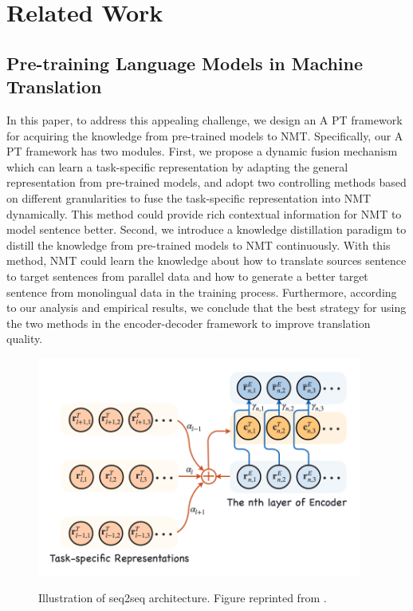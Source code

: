 \chapter{Related Work}

\section{Pre-training Language Models in Machine Translation}

\cite{weng2020acquiring} In this paper, to address this appealing challenge, we design an A PT framework for acquiring the knowledge from pre-trained models to NMT. Specifically, our A PT framework has two modules. First, we propose a dynamic fusion mechanism which can learn a task-specific representation by adapting the general representation from pre-trained models, and adopt two controlling methods based on different granularities to fuse the task-specific representation into NMT dynamically. This method could provide rich contextual information for NMT to model sentence better. Second, we introduce a knowledge distillation paradigm to distill the knowledge from pre-trained models to NMT continuously. With this method, NMT could learn the knowledge about how to translate sources sentence to target sentences from parallel data and how to generate a better target sentence from monolingual data in the training process. Furthermore, according to our analysis and empirical results, we conclude that the best strategy for using the two methods in the encoder-decoder framework to improve translation quality.

\begin{figure}[h]
    {\includegraphics[width=0.95\textwidth]{img/dynamic_fusion.png}}
    \centering
    \caption{Illustration of seq2seq architecture. Figure reprinted from \cite{weng2020acquiring}.}
    \label{img:dyn_fn}
\end{figure}

